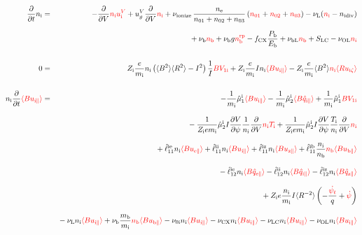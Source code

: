 \documentclass[11pt]{article}
\def\r#1{{\rm#1}}
\def\aves#1{\langle#1\rangle}
\def\dd#1#2{\frac{\partial #1}{\partial #2}}
\def\para{\parallel}
\def\ddV{\frac{\partial}{\partial V}}
\def\ddt{\frac{\partial}{\partial t}}
\def\psid{\dot{\psi}}
\def\psit{\psi_t}
\def\psitd{\dot{\psit}}
\def\mi{m_\r{i}}
\def\mb{m_\r{b}}
\def\nee{n_\r{e}}
\def\ni{n_\r{i}}
\def\nb{n_\r{b}}
\def\Ti{T_\r{i}}
\def\Zi{Z_\r{i}}
\def\uzt#1{u_{\r{#1}\zeta}}
\def\upara#1{u_{\r{#1}\para}}
\def\qhatpara#1{\hat{q}_{\r{#1}\para}}
\def\uV#1{u_\r{#1}^V}
\def\ugV{u_{g}^V}
\def\nun#1{\nu_\r{0#1}}
\def\ndiv#1{n_\r{#1div}}
\def\nbrp{n_\r{b}^\r{rp}}
\def\bri{\aves{B^2}\aves{R^2} - I^2}
\def\Pb{P_\r{b}}
\def\Eb{E_\r{b}}
\def\nna{n_{01}}
\def\nnb{n_{02}}
\def\nnc{n_{03}}
\def\fCX{f_\r{CX}}
\def\nuL{\nu_\r{L}}
\def\nuCX{\nu_\r{CX}}
\def\nuLC{\nu_\r{LC}}
\def\nuion{\nu_\r{ionize}}
\def\nub{\nu_\r{b}}
\def\nuOL{\nu_\r{OL}}
\def\nubL{\nu_\r{bL}}
\def\red#1{\textcolor{red}{#1}}
\begin{document}
\clearpage

%
\begin{eqnarray}
  \ddt \ni &=&
%
  - \ddV \red{\ni\uV{i}}
%
  + \ugV \ddV \red{\ni}
%
  + \nuion\, \frac{\nee}{\nna + \nnb + \nnc}\, (\red{\nna} +
  \red{\nnb} + \red{\nnc})
%
  - \nuL (\red{\ni} - \ndiv{i}) 
\nonumber\\[2.5mm]&&{}
%
  + \nub \red{\nb}
%
  + \nub g \red{\nbrp}
%
  - \fCX \frac{\Pb}{\Eb}
%
  + \nubL \red{\nb}
%
  + S_\r{LC}
%
  - \nuOL \red{\ni}
%
\\[5mm]
  0 &=&
%
    \Zi \frac{e}{\mi} \ni \left( \bri \right) \frac{1}{I} \red{B V_{1\r{i}}}
%
  + \Zi \frac{e}{\mi} I \ni \red{\aves{B\upara{i}}}
%
  - \Zi \frac{e}{\mi} \aves{B^2} \red{\ni \aves{R\uzt{i}}}
\\[5mm]
  \ni \ddt \red{\aves{B \upara{i}}} &=&
%
  - \frac{1}{\mi} \hat{\mu}_1^\r{i} \red{\aves{B \upara{i}}}
  - \frac{1}{\mi} \hat{\mu}_2^\r{i} \red{\aves{B \qhatpara{i}}}
%
  + \frac{1}{\mi} \hat{\mu}_1^\r{i} \red{B V_{1\r{i}}} 
\nonumber\\[3mm]&&{}
%
  - \frac{1}{\Zi e\mi} \hat{\mu}_2^\r{i} I \dd{V}{\psi} \frac{1}{\ni}
  \ddV \red{\ni\Ti}
  + \frac{1}{\Zi e\mi} \hat{\mu}_2^\r{i} I \dd{V}{\psi} \frac{\Ti}{\ni}
  \ddV \red{\ni}
\nonumber\\[3mm]&&{}
%
  + \hat{\ell}_{11}^{\r{ie}} \ni \red{\aves{B \upara{e}}}
  + \hat{\ell}_{11}^{\r{ii}} \ni \red{\aves{B \upara{i}}}
  + \hat{\ell}_{11}^{\r{iz}} \ni \red{\aves{B \upara{z}}}
  + \hat{\ell}_{11}^{\r{ib}} \frac{\ni}{\nb} \red{\nb \aves{B \upara{b}}}
\nonumber\\[3mm]&&{}
%
  - \hat{\ell}_{12}^{\r{ie}} \ni \red{\aves{B \qhatpara{e}}}
  - \hat{\ell}_{12}^{\r{ii}} \ni \red{\aves{B \qhatpara{i}}}
  - \hat{\ell}_{12}^{\r{iz}} \ni \red{\aves{B \qhatpara{z}}}
\nonumber\\[3mm]&&{}
%
  + \Zi e \frac{\ni}{\mi} I \aves{R^{-2}} \left( - \frac{\red{\psitd}}{q} + \red{\psid} \right)
%
%
\nonumber\\[3mm]&&{}
%
  - \nuL  \ni \red{\aves{B \upara{i}}}
%
  + \nub  \frac{\mb}{\mi} \red{\nb \aves{B \upara{b}}}
%
  - \nun{i} \ni \red{\aves{B \upara{i}}}
%
  - \nuCX \ni \red{\aves{B \upara{i}}}
%
  - \nuLC \ni \red{\aves{B \upara{i}}}
%
  - \nuOL \ni \red{\aves{B \upara{i}}}
\nonumber\\[3mm]&&{}

\end{eqnarray}
\end{document}
